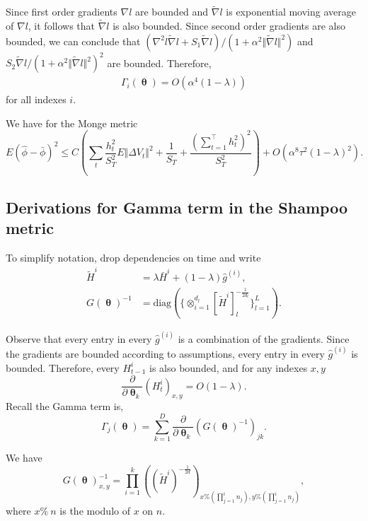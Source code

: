 \documentclass[10pt]{article} %
\DeclareMathOperator{\btheta}{\boldsymbol{\theta}}
\theoremstyle{plain}
\theoremstyle{definition}
\theoremstyle{remark}
\begin{document}
Since first order gradients $\nabla l$ are bounded and $\tilde{\nabla} l$ is exponential moving average of $\nabla l$, it follows that $\tilde{\nabla} l$ is also bounded. Since second order gradients are also bounded, we can conclude that 
${(\nabla^2 l \tilde{\nabla}l+S_{1}\tilde{\nabla}l)}/{(1+\alpha^{2}\Vert\tilde{\nabla}l\Vert^{2})}$ 
and 
${S_{2}\tilde{\nabla}l}/ {(1+\alpha^{2}\Vert\tilde{\nabla}l\Vert^{2})^{2}}$ 
are bounded. Therefore,
\begin{align*}
\Gamma_{i}(\btheta) = O(\alpha^{4}(1-\lambda))
\end{align*}
for all indexes $i$.

We have for the Monge metric
\begin{equation*}
E\left(\hat{\phi}-\bar{\phi}\right)^{2} \leq C\left(\sum_{t}\frac{h_{t}^2}{S_{T}^{2}}E\Vert\Delta V_{t}\Vert^{2}+\frac{1}{S_T}+\frac{(\sum_{t=1}^{\top}h_{t}^2)^{2}}{S_{T}^2}\right) + O(\alpha^{8}\tau^{2}(1-\lambda)^2).
\end{equation*}

\subsection{Derivations for Gamma term in the Shampoo metric}
\label{app:proofShampoo}


To simplify notation, drop dependencies on time and write
\begin{align*}
\tilde{H}^{i} &= \lambda \bar{H}^{i}+(1-\lambda)\hat{g}^{(i)},\\
G(\btheta)^{-1} &= \text{diag}(\{\otimes_{i=1}^{d_l} [\tilde{H}^{i}]_{l}^{-\frac{1}{2d_l}}\}_{l=1}^{L}).
\end{align*}

Observe that every entry in every $\hat{g}^{(i)}$ is a combination of the gradients. Since the gradients are bounded according to assumptions, every entry in every $\hat{g}^{(i)}$ is bounded. Therefore, every $H_{t-1}^{i}$ is also bounded, and for any indexes $x,y$
\begin{equation*}
\frac{\partial}{\partial\btheta_k}(H^{i}_{t})_{x,y}=O(1-\lambda).
\end{equation*}
Recall the Gamma term is,
\begin{equation*}
\Gamma_{j}(\btheta) = \sum_{k=1}^{D}\frac{\partial}{\partial\btheta_k}(G(\btheta)^{-1})_{jk}.
\end{equation*}

We have 
\begin{equation*}
G(\btheta)^{-1}_{x,y} = \prod_{i=1}^{k} \left( (\tilde{H}^{i})^{-\frac{1}{2d}}\right)_{x\% (\prod_{j=1}^{i}n_{j}),y\%(\prod_{j=1}^{i}n_{j})},
\end{equation*}
where $x\% \ n$ is the modulo of $x$ on $n$.
\end{document}
